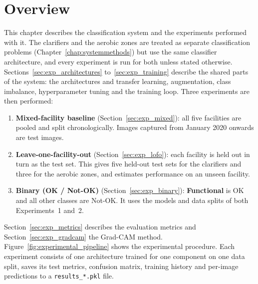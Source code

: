 \label{chap:experimental_design}

\section{Overview}
\label{sec:exp_overview}

This chapter describes the classification system and the experiments performed with it. The clarifiers and the aerobic zones are treated as separate classification problems (Chapter~\ref{chap:systemmethods}) but use the same classifier architecture, and every experiment is run for both unless stated otherwise. Sections~\ref{sec:exp_architectures} to~\ref{sec:exp_training} describe the shared parts of the system: the architectures and transfer learning, augmentation, class imbalance, hyperparameter tuning and the training loop. Three experiments are then performed:

\begin{enumerate}
    \item \textbf{Mixed-facility baseline} (Section~\ref{sec:exp_mixed}): all five facilities are pooled and split chronologically. Images captured from January 2020 onwards are test images.
    \item \textbf{Leave-one-facility-out} (Section~\ref{sec:exp_lofo}): each facility is held out in turn as the test set. This gives five held-out test sets for the clarifiers and three for the aerobic zones, and estimates performance on an unseen facility.
    \item \textbf{Binary (OK / Not-OK)} (Section~\ref{sec:exp_binary}): \textbf{Functional} is OK and all other classes are Not-OK. It uses the models and data splits of both Experiments~1 and~2.
\end{enumerate}

Section~\ref{sec:exp_metrics} describes the evaluation metrics and Section~\ref{sec:exp_gradcam} the Grad-CAM method. Figure~\ref{fig:experimental_pipeline} shows the experimental procedure. Each experiment consists of one architecture trained for one component on one data split, saves its test metrics, confusion matrix, training history and per-image predictions to a \texttt{results\_*.pkl} file.

